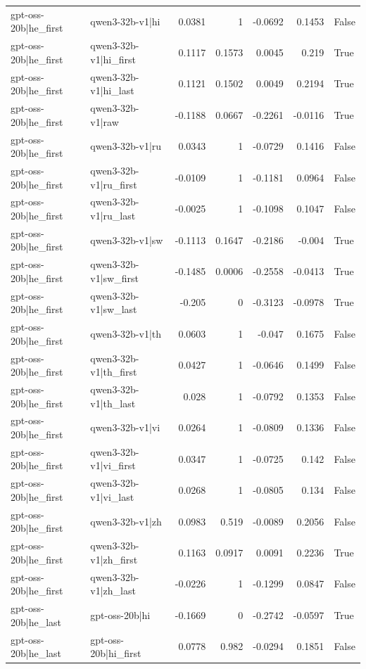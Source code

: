 \begin{table}
\begin{tabular}{l l r r r r l}
gpt-oss-20b|he_first & qwen3-32b-v1|hi & 0.0381 & 1 & -0.0692 & 0.1453 & False \\
gpt-oss-20b|he_first & qwen3-32b-v1|hi_first & 0.1117 & 0.1573 & 0.0045 & 0.219 & True \\
gpt-oss-20b|he_first & qwen3-32b-v1|hi_last & 0.1121 & 0.1502 & 0.0049 & 0.2194 & True \\
gpt-oss-20b|he_first & qwen3-32b-v1|raw & -0.1188 & 0.0667 & -0.2261 & -0.0116 & True \\
gpt-oss-20b|he_first & qwen3-32b-v1|ru & 0.0343 & 1 & -0.0729 & 0.1416 & False \\
gpt-oss-20b|he_first & qwen3-32b-v1|ru_first & -0.0109 & 1 & -0.1181 & 0.0964 & False \\
gpt-oss-20b|he_first & qwen3-32b-v1|ru_last & -0.0025 & 1 & -0.1098 & 0.1047 & False \\
gpt-oss-20b|he_first & qwen3-32b-v1|sw & -0.1113 & 0.1647 & -0.2186 & -0.004 & True \\
gpt-oss-20b|he_first & qwen3-32b-v1|sw_first & -0.1485 & 0.0006 & -0.2558 & -0.0413 & True \\
gpt-oss-20b|he_first & qwen3-32b-v1|sw_last & -0.205 & 0 & -0.3123 & -0.0978 & True \\
gpt-oss-20b|he_first & qwen3-32b-v1|th & 0.0603 & 1 & -0.047 & 0.1675 & False \\
gpt-oss-20b|he_first & qwen3-32b-v1|th_first & 0.0427 & 1 & -0.0646 & 0.1499 & False \\
gpt-oss-20b|he_first & qwen3-32b-v1|th_last & 0.028 & 1 & -0.0792 & 0.1353 & False \\
gpt-oss-20b|he_first & qwen3-32b-v1|vi & 0.0264 & 1 & -0.0809 & 0.1336 & False \\
gpt-oss-20b|he_first & qwen3-32b-v1|vi_first & 0.0347 & 1 & -0.0725 & 0.142 & False \\
gpt-oss-20b|he_first & qwen3-32b-v1|vi_last & 0.0268 & 1 & -0.0805 & 0.134 & False \\
gpt-oss-20b|he_first & qwen3-32b-v1|zh & 0.0983 & 0.519 & -0.0089 & 0.2056 & False \\
gpt-oss-20b|he_first & qwen3-32b-v1|zh_first & 0.1163 & 0.0917 & 0.0091 & 0.2236 & True \\
gpt-oss-20b|he_first & qwen3-32b-v1|zh_last & -0.0226 & 1 & -0.1299 & 0.0847 & False \\
gpt-oss-20b|he_last & gpt-oss-20b|hi & -0.1669 & 0 & -0.2742 & -0.0597 & True \\
gpt-oss-20b|he_last & gpt-oss-20b|hi_first & 0.0778 & 0.982 & -0.0294 & 0.1851 & False \\

\end{tabular}
\end{table}

